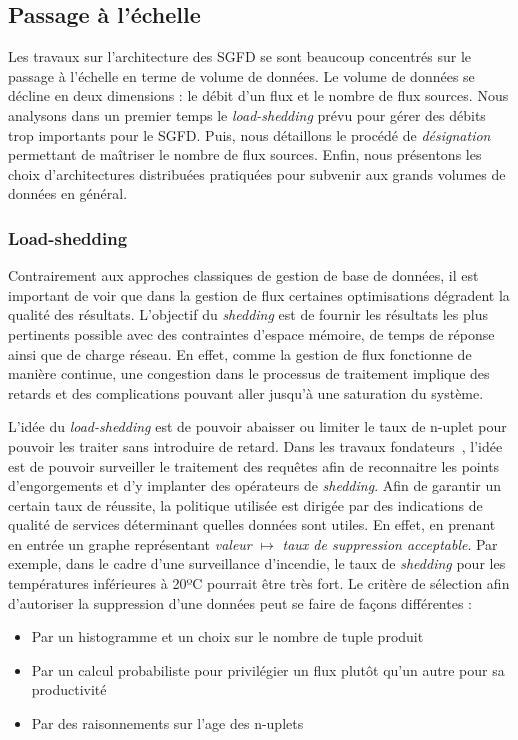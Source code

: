 \subsection{Passage à l'échelle}\label{sec:rw:sgfd:infra:echelle}
Les travaux sur l'architecture des SGFD se sont beaucoup concentrés sur le passage à l'échelle en terme de volume de données. Le volume de données se décline en deux dimensions : le débit d'un flux et le nombre de flux sources. Nous analysons dans un premier temps le \textit{load-shedding} prévu pour gérer des débits trop importants pour le SGFD. Puis, nous détaillons le procédé de \textit{désignation} permettant de maîtriser le nombre de flux sources. Enfin, nous présentons les choix d'architectures distribuées pratiquées pour subvenir aux grands volumes de données en général.

\subsubsection{Load-shedding}
Contrairement aux approches classiques de gestion de base de données, il est important de voir que dans la gestion de flux certaines optimisations dégradent la qualité des résultats. L'objectif du \textit{shedding} est de fournir les résultats les plus pertinents possible avec des contraintes d'espace mémoire, de temps de réponse ainsi que de charge réseau. En effet, comme la gestion de flux fonctionne de manière continue, une congestion dans le processus de traitement implique des retards et des complications pouvant aller jusqu'à une saturation du système.

L'idée du \textit{load-shedding} est de pouvoir abaisser ou limiter le taux de n-uplet pour pouvoir les traiter sans introduire de retard. Dans les travaux fondateurs~\cite{Tatbul:window,Tatbul:load-shedding}, l'idée est de pouvoir surveiller le traitement des requêtes afin de reconnaitre les points d'engorgements et d'y implanter des opérateurs de \textit{shedding}. Afin de garantir un certain taux de réussite, la politique utilisée est dirigée par des indications de qualité de services déterminant quelles données sont utiles. En effet, en prenant en entrée un graphe représentant \textit{valeur} $\mapsto$  \textit{taux de suppression acceptable}. Par exemple, dans le cadre d'une surveillance d'incendie, le taux de \textit{shedding} pour les températures inférieures à 20ºC pourrait être très fort. Le critère de sélection afin d'autoriser la suppression d'une données peut se faire de façons différentes :
\begin{itemize}
 \item Par un histogramme et un choix sur le nombre de tuple produit~\cite{Han:join}
 \item Par un calcul probabiliste pour privilégier un flux plutôt qu'un autre pour sa productivité~\cite{Han:join}
 \item Par des raisonnements sur l'age des n-uplets~\cite{Srivastava:join}
\end{itemize}

